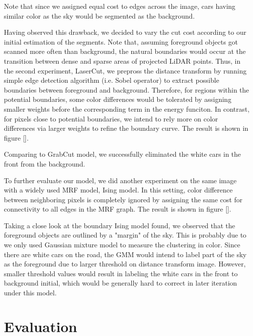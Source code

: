 \documentclass{article} %
\begin{document}
Note that since we assigned equal cost to edges across the image, cars having similar color as the sky would be segmented as the background.

Having observed this drawback, we decided to vary the cut cost according to our initial estimation of the segments. Note that, assuming foreground objects got scanned more often than background, the natural boundaries would occur at the transition between dense and sparse areas of projected LiDAR points. Thus, in the second experiment, LaserCut, we prepross the distance transform by running simple edge detection algorithm (i.e. Sobel operator) to extract possible boundaries between foreground and background. Therefore, for regions within the potential boundaries, some color differences would be tolerated by assigning smaller weights before the corresponding term in the energy funciton. In contrast, for pixels close to potential boundaries, we intend to rely more on color differences via larger weights to refine the boundary curve. The result is shown in figure [].

Comparing to GrabCut model, we successfully eliminated the white cars in the front from the background.

To further evaluate our model, we did another experiment on the same image with a widely used MRF model, Ising model. In this setting, color difference between neighboring pixels is completely ignored by assigning the same cost for connectivity to all edges in the MRF graph. The result is shown in figure [].

Taking a close look at the boundary Ising model found, we observed that the foreground objects are outlined by a "margin" of the sky. This is probably due to we only used Gaussian mixture model to measure the clustering in color. Since there are white cars on the road, the GMM would intend to label part of the sky as the foreground due to larger threshold on distance transform image. However, smaller threshold values would result in labeling the white cars in the front to background initial, which would be generally hard to correct in later iteration under this model.

\section{Evaluation}
\end{document}
